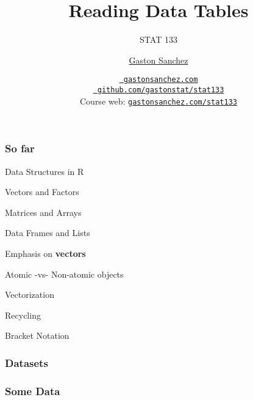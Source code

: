 \documentclass[12pt]{beamer}\usepackage[]{graphicx}\usepackage[]{color}
\title{Reading Data Tables}
\subtitle{STAT 133}
\author{\href{http://www.gastonsanchez.com}{Gaston Sanchez}}
\institute{Department of Statistics, UC{\textendash}Berkeley}
\date{\href{http://www.gastonsanchez.com}{\tt \scriptsize \color{foreground} gastonsanchez.com}
\\[-4pt]
\href{http://github.com/gastonstat/stat133}{\tt \scriptsize \color{foreground} github.com/gastonstat/stat133}
\\[-4pt]
{\scriptsize Course web: \href{http://www.gastonsanchez.com/stat133}{\tt gastonsanchez.com/stat133}}
}
\begin{document}
{
  \frame{
    \titlepage
  } 
}


\begin{frame}
\begin{center}
\Huge{}
\end{center}
\end{frame}


\begin{frame}
\frametitle{So far}

\bi
  \item Data Structures in R
  \bi
    \item Vectors and Factors
    \item Matrices and Arrays
    \item Data Frames and Lists
  \ei
  \item Emphasis on \textbf{vectors}
  \item Atomic -vs- Non-atomic objects
  \item Vectorization
  \item Recycling
  \item Bracket Notation
\ei

\end{frame}


\begin{frame}
\begin{center}
\Huge{}
\end{center}
\end{frame}


\begin{frame}
\frametitle{Datasets}

\eb
\begin{center}
\end{center}

\end{frame}


\begin{frame}[fragile]
\frametitle{Some Data}
\begin{center}
\end{center}
\end{frame}
\end{document}

